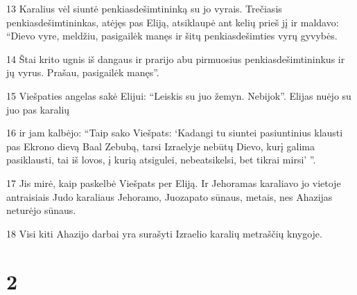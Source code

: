 \par 13 Karalius vėl siuntė penkiasdešimtininką su jo vyrais. Trečiasis penkiasdešimtininkas, atėjęs pas Eliją, atsiklaupė ant kelių prieš jį ir maldavo: “Dievo vyre, meldžiu, pasigailėk manęs ir šitų penkiasdešimties vyrų gyvybės. 
\par 14 Štai krito ugnis iš dangaus ir prarijo abu pirmuosius penkiasdešimtininkus ir jų vyrus. Prašau, pasigailėk manęs”. 
\par 15 Viešpaties angelas sakė Elijui: “Leiskis su juo žemyn. Nebijok”. Elijas nuėjo su juo pas karalių 
\par 16 ir jam kalbėjo: “Taip sako Viešpats: ‘Kadangi tu siuntei pasiuntinius klausti pas Ekrono dievą Baal Zebubą, tarsi Izraelyje nebūtų Dievo, kurį galima pasiklausti, tai iš lovos, į kurią atsigulei, nebeatsikelsi, bet tikrai mirsi’ ”. 
\par 17 Jis mirė, kaip paskelbė Viešpats per Eliją. Ir Jehoramas karaliavo jo vietoje antraisiais Judo karaliaus Jehoramo, Juozapato sūnaus, metais, nes Ahazijas neturėjo sūnaus. 
\par 18 Visi kiti Ahazijo darbai yra surašyti Izraelio karalių metraščių knygoje.


\chapter{2}


